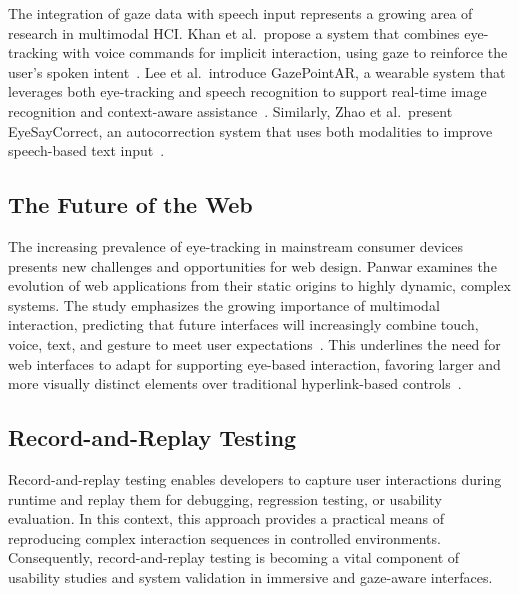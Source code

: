The integration of gaze data with speech input represents a growing area of research in multimodal HCI. Khan et al.\ propose a system that combines eye-tracking with voice commands for implicit interaction, using gaze to reinforce the user's spoken intent~\cite{khan2022integrating}. Lee et al.\ introduce GazePointAR, a wearable system that leverages both eye-tracking and speech recognition to support real-time image recognition and context-aware assistance~\cite{lee2024gazepointar}. Similarly, Zhao et al.\ present EyeSayCorrect, an autocorrection system that uses both modalities to improve speech-based text input~\cite{zhao2022eyesaycorrect}.

\subsection{The Future of the Web}

The increasing prevalence of eye-tracking in mainstream consumer devices presents new challenges and opportunities for web design. Panwar examines the evolution of web applications from their static origins to highly dynamic, complex systems. The study emphasizes the growing importance of multimodal interaction, predicting that future interfaces will increasingly combine touch, voice, text, and gesture to meet user expectations~\cite{panwar2024webevolution}. This underlines the need for web interfaces to adapt for supporting eye-based interaction, favoring larger and more visually distinct elements over traditional hyperlink-based controls~\cite{apple2024spatialweb}.


\subsection{Record-and-Replay Testing}

Record-and-replay testing enables developers to capture user interactions during runtime and replay them for debugging, regression testing, or usability evaluation\cite{vasquez2018continuous, moran2016automatically}. In this context, this approach provides a practical means of reproducing complex interaction sequences in controlled environments. Consequently, record-and-replay testing is becoming a vital component of usability studies and system validation in immersive and gaze-aware interfaces.


